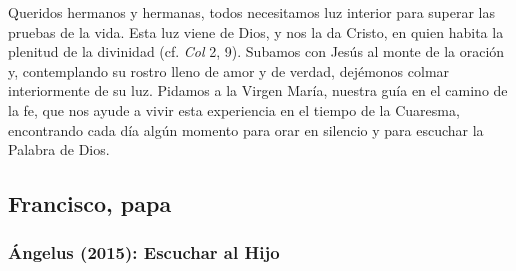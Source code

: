 \begin{body}
Queridos hermanos y hermanas, todos necesitamos luz interior para superar las pruebas de la vida. Esta luz viene de Dios, y nos la da Cristo, en quien habita la plenitud de la divinidad (cf. \textit{Col} 2, 9). Subamos con Jesús al monte de la oración y, contemplando su rostro lleno de amor y de verdad, dejémonos colmar interiormente de su luz. Pidamos a la Virgen María, nuestra guía en el camino de la fe, que nos ayude a vivir esta experiencia en el tiempo de la Cuaresma, encontrando cada día algún momento para orar en silencio y para escuchar la Palabra de Dios.
\end{body}

\newsection
\subsection{Francisco, papa}

\subsubsection{Ángelus (2015): Escuchar al Hijo}


